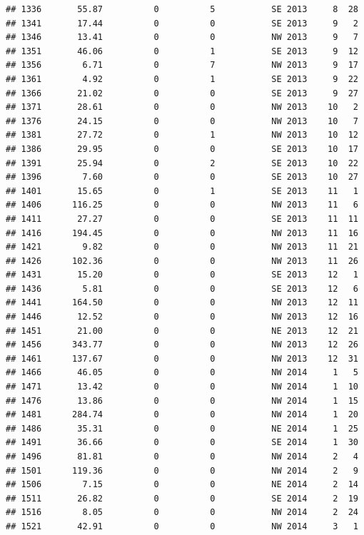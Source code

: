 \documentclass[
]{article}
\begin{document}
\begin{verbatim}
## 1336       55.87          0          5           SE 2013     8  28
## 1341       17.44          0          0           SE 2013     9   2
## 1346       13.41          0          0           NW 2013     9   7
## 1351       46.06          0          1           SE 2013     9  12
## 1356        6.71          0          7           NW 2013     9  17
## 1361        4.92          0          1           SE 2013     9  22
## 1366       21.02          0          0           SE 2013     9  27
## 1371       28.61          0          0           NW 2013    10   2
## 1376       24.15          0          0           NW 2013    10   7
## 1381       27.72          0          1           NW 2013    10  12
## 1386       29.95          0          0           SE 2013    10  17
## 1391       25.94          0          2           SE 2013    10  22
## 1396        7.60          0          0           SE 2013    10  27
## 1401       15.65          0          1           SE 2013    11   1
## 1406      116.25          0          0           NW 2013    11   6
## 1411       27.27          0          0           SE 2013    11  11
## 1416      194.45          0          0           NW 2013    11  16
## 1421        9.82          0          0           NW 2013    11  21
## 1426      102.36          0          0           NW 2013    11  26
## 1431       15.20          0          0           SE 2013    12   1
## 1436        5.81          0          0           SE 2013    12   6
## 1441      164.50          0          0           NW 2013    12  11
## 1446       12.52          0          0           NW 2013    12  16
## 1451       21.00          0          0           NE 2013    12  21
## 1456      343.77          0          0           NW 2013    12  26
## 1461      137.67          0          0           NW 2013    12  31
## 1466       46.05          0          0           NW 2014     1   5
## 1471       13.42          0          0           NW 2014     1  10
## 1476       13.86          0          0           NW 2014     1  15
## 1481      284.74          0          0           NW 2014     1  20
## 1486       35.31          0          0           NE 2014     1  25
## 1491       36.66          0          0           SE 2014     1  30
## 1496       81.81          0          0           NW 2014     2   4
## 1501      119.36          0          0           NW 2014     2   9
## 1506        7.15          0          0           NE 2014     2  14
## 1511       26.82          0          0           SE 2014     2  19
## 1516        8.05          0          0           NW 2014     2  24
## 1521       42.91          0          0           NW 2014     3   1

\end{verbatim}
\end{document}
